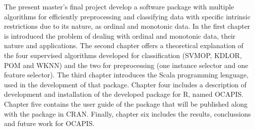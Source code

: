 
The present master's final project develop a software package with multiple algorithms for efficiently preprocessing and classifying data with specific intrinsic restrictions due to its nature, as ordinal and monotonic data. \newline
In the first chapter is introduced the problem of dealing with ordinal and monotonic data, their nature and applications. The second chapter offers a theoretical explanation of the four supervised algorithms developed for classification (SVMOP, KDLOR, POM and WKNN) and the two for preprocessing (one instance selector and one feature selector). The third chapter introduces the Scala programming lenguage, used in the development of that package. Chapter four includes a description of development and installation of the developed package for R, named OCAPIS. Chapter five contains the user guide of the package that will be published along with the package in CRAN. Finally, chapter six includes the results, conclussions and future work for OCAPIS. 
\newline \newline
{}
